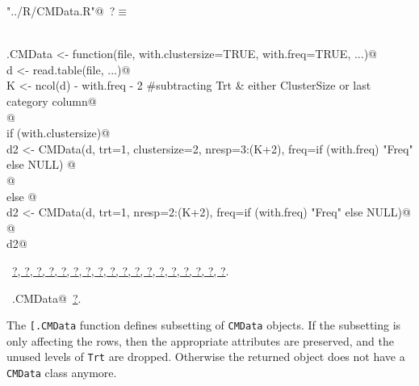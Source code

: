 \documentclass[reqno]{amsart}
\renewcommand{\NWtarget}[2]{\hypertarget{#1}{#2}}
\renewcommand{\NWlink}[2]{\hyperlink{#1}{#2}}
\begin{document}
\begin{flushleft} \small
\begin{minipage}{\linewidth}\label{scrap4}\raggedright\small
\NWtarget{nuweb?}{} \verb@"../R/CMData.R"@\nobreak\ {\footnotesize {?}}$\equiv$
\vspace{-1ex}
\begin{list}{}{} \item
\mbox{}\verb@@\\
\mbox{}\verb@read.CMData <- function(file, with.clustersize=TRUE, with.freq=TRUE, ...){@\\
\mbox{}\verb@  d <- read.table(file, ...)@\\
\mbox{}\verb@  K <- ncol(d) - with.freq - 2  #subtracting Trt & either ClusterSize or last category column@\\
\mbox{}\verb@  @\\
\mbox{}\verb@  if (with.clustersize){@\\
\mbox{}\verb@    d2 <- CMData(d, trt=1, clustersize=2, nresp=3:(K+2), freq=if (with.freq) "Freq" else NULL) @\\
\mbox{}\verb@  }@\\
\mbox{}\verb@  else {@\\
\mbox{}\verb@    d2 <- CMData(d, trt=1, nresp=2:(K+2), freq=if (with.freq) "Freq" else NULL)@\\
\mbox{}\verb@  }@\\
\mbox{}\verb@  d2}@\\
\mbox{}\verb@@{\NWsep}
\end{list}
\vspace{-1.5ex}
\footnotesize
\begin{list}{}{\setlength{\itemsep}{-\parsep}\setlength{\itemindent}{-\leftmargin}}
\item \NWtxtFileDefBy\ \NWlink{nuweb?}{?}\NWlink{nuweb?}{, ?}\NWlink{nuweb?}{, ?}\NWlink{nuweb?}{, ?}\NWlink{nuweb?}{, ?}\NWlink{nuweb?}{, ?}\NWlink{nuweb?}{, ?}\NWlink{nuweb?}{, ?}\NWlink{nuweb?}{, ?}\NWlink{nuweb?}{, ?}\NWlink{nuweb?}{, ?}\NWlink{nuweb?}{, ?}\NWlink{nuweb?}{, ?}\NWlink{nuweb?}{, ?}\NWlink{nuweb?}{, ?}\NWlink{nuweb?}{, ?}\NWlink{nuweb?}{, ?}\NWlink{nuweb?}{, ?}.
\item \NWtxtIdentsDefed\nobreak\  \verb@read.CMData@\nobreak\ \NWlink{nuweb?}{?}.
\item{}
\end{list}
\end{minipage}\vspace{4ex}
\end{flushleft}
The \texttt{[.CMData} function defines subsetting of \texttt{CMData} objects. If the subsetting is only affecting the rows, then
the appropriate attributes are preserved, and the unused levels of \texttt{Trt} are dropped. Otherwise the returned object does not
have a \texttt{CMData} class anymore.
\end{document}

